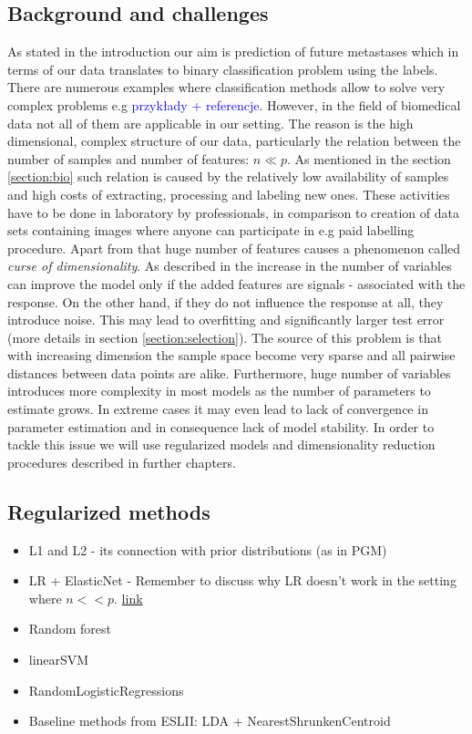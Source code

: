\documentclass[12pt, wide]{mwart}
\begin{document}
\subsection{Background and challenges} \label{section:challenges}

As stated in the introduction our aim is prediction of future metastases which in terms of our data translates to binary classification problem using the labels. There are numerous examples where classification methods allow to solve very complex problems e.g \textcolor{blue}{przykłady + referencje}. However, in the field of biomedical data not all of them are applicable in our setting. The reason is the high dimensional, complex structure of our data, particularly the relation between the number of samples and number of features: $n \ll p$. As mentioned in the section \ref{section:bio} such relation is caused by the relatively low availability of samples and high costs of extracting, processing and labeling new ones. These activities have to be done in laboratory by professionals, in comparison to creation of data sets containing images where anyone can participate in e.g paid labelling procedure. Apart from that huge number of features causes a phenomenon called \textit{curse of dimensionality}. As described in \cite{ISL} the increase in the number of variables can improve the model only if the added features are signals - associated with the response. On the other hand, if they do not influence the response at all, they introduce noise. This may lead to overfitting and significantly larger test error (more details in section \ref{section:selection}). The source of this problem is that with increasing dimension the sample space become very sparse and all pairwise distances between data points are alike. Furthermore, huge number of variables introduces more complexity in most models as the number of parameters to estimate grows. In extreme cases it may even lead to lack of convergence in parameter estimation and in consequence lack of model stability. In order to tackle this issue we will use regularized models and dimensionality reduction procedures described in further chapters.

\subsection{Regularized methods}

\begin{itemize}
    
    \item L1 and L2 - its connection with prior distributions (as in PGM)
    \item LR + ElasticNet - Remember to discuss why LR doesn't work in the setting where $n << p$. \textcolor{blue}{\href{https://stats.stackexchange.com/questions/139353/why-does-logistic-regression-not-work-in-p-n-setting}{link}}
    \item Random forest
    \item linearSVM
    \item RandomLogisticRegressions
    \item Baseline methods from ESLII: LDA + NearestShrunkenCentroid
\end{itemize}
\end{document}
